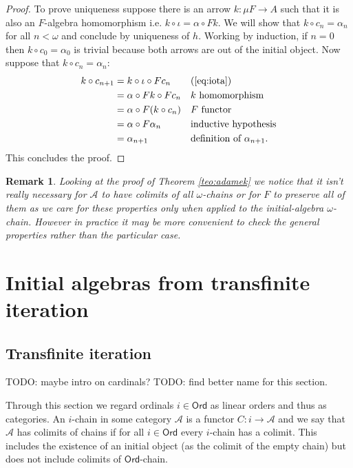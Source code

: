 \documentclass[letterpaper, 11pt, oneside]{memoir}
\theoremstyle{myteo}
\newtheorem{remark}[theorem]{Remark}
\numberwithin{equation}{section}
\newcommand{\marginnote}[1]{\marginpar{\footnotesize #1}}
\newcommand{\Ord}{\textsf{Ord}}
\newcommand{\A}{\mathscr{A}}
\begin{document}
\begin{proof}
  To prove uniqueness suppose there is an arrow \(k \colon \mu F \to A\) such that it is also an \(F\)-algebra homomorphism i.e. \(k \circ \iota = \alpha \circ Fk\).
  We will show that \(k \circ c_n = \alpha_n\) for all \(n < \omega\) and conclude by uniqueness of \(h\).
  Working by induction, if \(n = 0\) then \(k \circ c_0 = \alpha_0\) is trivial because both arrows are out of the initial object.
  Now suppose that \(k \circ c_n = \alpha_n\):
  \begin{align*}
    k \circ c_{n+1} &= k \circ \iota \circ Fc_n && \text{(\ref{eq:iota})}\\
    &= \alpha \circ Fk \circ Fc_n && \text{\(k\) homomorphism}\\
    &= \alpha \circ F(k \circ c_n) && \text{\(F\) functor}\\
    &= \alpha \circ F\alpha_n && \text{inductive hypothesis}\\
    &= \alpha_{n+1} && \text{definition of \(\alpha_{n+1}\)}.\\
  \end{align*}
  This concludes the proof.
\end{proof}

\begin{remark}
  Looking at the proof of Theorem \ref{teo:adamek} we notice that it isn't really necessary for \(\A\) to have colimits of \emph{all} \(\omega\)-chains or for \(F\) to preserve \emph{all} of them as we care for these properties only when applied to the initial-algebra \(\omega\)-chain.
  However in practice it may be more convenient to check the general properties rather than the particular case.
\end{remark}

\chapter{Initial algebras from transfinite iteration}
\newpage

\section{Transfinite iteration}

\begin{tcolorbox}
  TODO: maybe intro on cardinals?
  TODO: find better name for this section.
\end{tcolorbox}

Through this section we regard ordinals \(i \in \Ord\) as linear orders and thus as categories.
An \(i\)-chain in some category \(\A\) is a functor \(C : i \to \A \)\marginnote{\(i\)-chain} and we say that \(\A\) has colimits of chains if for all \(i \in \Ord\) every \(i\)-chain has a colimit.
This includes the existence of an initial object (as the colimit of the empty chain) but does not include colimits of \(\Ord\)-chain.
\end{document}

